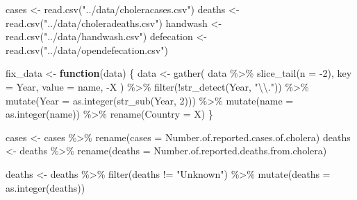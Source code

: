 \documentclass[
]{article}
\newenvironment{Shaded}{\begin{snugshade}}{\end{snugshade}}
\newcommand{\AttributeTok}[1]{\textcolor[rgb]{0.77,0.63,0.00}{#1}}
\newcommand{\ControlFlowTok}[1]{\textcolor[rgb]{0.13,0.29,0.53}{\textbf{#1}}}
\newcommand{\DecValTok}[1]{\textcolor[rgb]{0.00,0.00,0.81}{#1}}
\newcommand{\FunctionTok}[1]{\textcolor[rgb]{0.00,0.00,0.00}{#1}}
\newcommand{\NormalTok}[1]{#1}
\newcommand{\OtherTok}[1]{\textcolor[rgb]{0.56,0.35,0.01}{#1}}
\newcommand{\SpecialCharTok}[1]{\textcolor[rgb]{0.00,0.00,0.00}{#1}}
\newcommand{\StringTok}[1]{\textcolor[rgb]{0.31,0.60,0.02}{#1}}
\begin{document}
\begin{Shaded}
\begin{Highlighting}[]
\NormalTok{cases }\OtherTok{\textless{}{-}} \FunctionTok{read.csv}\NormalTok{(}\StringTok{"../data/choleracases.csv"}\NormalTok{)}
\NormalTok{deaths }\OtherTok{\textless{}{-}} \FunctionTok{read.csv}\NormalTok{(}\StringTok{"../data/choleradeaths.csv"}\NormalTok{)}
\NormalTok{handwash }\OtherTok{\textless{}{-}} \FunctionTok{read.csv}\NormalTok{(}\StringTok{"../data/handwash.csv"}\NormalTok{)}
\NormalTok{defecation }\OtherTok{\textless{}{-}} \FunctionTok{read.csv}\NormalTok{(}\StringTok{"../data/opendefecation.csv"}\NormalTok{)}

\NormalTok{fix\_data }\OtherTok{\textless{}{-}} \ControlFlowTok{function}\NormalTok{(data) \{}
\NormalTok{data }\OtherTok{\textless{}{-}}
  \FunctionTok{gather}\NormalTok{(}
\NormalTok{    data }\SpecialCharTok{\%\textgreater{}\%} \FunctionTok{slice\_tail}\NormalTok{(}\AttributeTok{n =} \SpecialCharTok{{-}}\DecValTok{2}\NormalTok{),}
    \AttributeTok{key =}\NormalTok{ Year,}
    \AttributeTok{value =}\NormalTok{ name,}
    \SpecialCharTok{{-}}\NormalTok{X}
\NormalTok{  ) }\SpecialCharTok{\%\textgreater{}\%}
  \FunctionTok{filter}\NormalTok{(}\SpecialCharTok{!}\FunctionTok{str\_detect}\NormalTok{(Year, }\StringTok{"}\SpecialCharTok{\textbackslash{}\textbackslash{}}\StringTok{."}\NormalTok{)) }\SpecialCharTok{\%\textgreater{}\%}
  \FunctionTok{mutate}\NormalTok{(}\AttributeTok{Year =} \FunctionTok{as.integer}\NormalTok{(}\FunctionTok{str\_sub}\NormalTok{(Year, }\DecValTok{2}\NormalTok{))) }\SpecialCharTok{\%\textgreater{}\%}
  \FunctionTok{mutate}\NormalTok{(}\AttributeTok{name =} \FunctionTok{as.integer}\NormalTok{(name)) }\SpecialCharTok{\%\textgreater{}\%}
  \FunctionTok{rename}\NormalTok{(}\AttributeTok{Country =}\NormalTok{ X)}
\NormalTok{\}}

\NormalTok{cases }\OtherTok{\textless{}{-}}\NormalTok{ cases }\SpecialCharTok{\%\textgreater{}\%} \FunctionTok{rename}\NormalTok{(}\AttributeTok{cases =}\NormalTok{ Number.of.reported.cases.of.cholera)}
\NormalTok{deaths }\OtherTok{\textless{}{-}}\NormalTok{ deaths }\SpecialCharTok{\%\textgreater{}\%} \FunctionTok{rename}\NormalTok{(}\AttributeTok{deaths =}\NormalTok{ Number.of.reported.deaths.from.cholera)}

\NormalTok{deaths }\OtherTok{\textless{}{-}}\NormalTok{ deaths }\SpecialCharTok{\%\textgreater{}\%} 
  \FunctionTok{filter}\NormalTok{(deaths }\SpecialCharTok{!=} \StringTok{"Unknown"}\NormalTok{) }\SpecialCharTok{\%\textgreater{}\%}
  \FunctionTok{mutate}\NormalTok{(}\AttributeTok{deaths =} \FunctionTok{as.integer}\NormalTok{(deaths))}
\end{Highlighting}
\end{Shaded}
\end{document}
